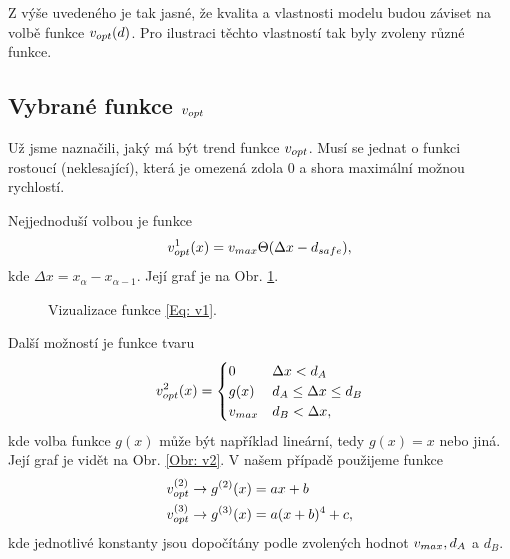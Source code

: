 \documentclass[a4paper, 12pt, fleqn]{article}
\begin{document}
Z výše uvedeného je tak jasné, že kvalita a vlastnosti modelu budou záviset na volbě funkce $v_{opt}(d)$. Pro ilustraci těchto vlastností tak byly zvoleny různé funkce.

\subsection{Vybrané funkce $v_{opt}$}
Už jsme naznačili, jaký má být trend funkce $v_{opt}$. Musí se jednat o funkci rostoucí (neklesající), která je omezená zdola 0 a shora maximální možnou rychlostí.

Nejjednoduší volbou je funkce
\begin{equation}
	v_{opt}^1(x) = v_{max} \Theta (\Delta x - d_{safe}),
	\label{Eq: v1}
\end{equation}
kde $\Delta x = x_{\alpha} - x_{\alpha - 1}$. Její graf je na Obr. \ref{Obr: v1}.

\begin{figure}
	\centering
	\caption{Vizualizace funkce \eqref{Eq: v1}.}
	\label{Obr: v1}
\end{figure}

Další možností je funkce tvaru
\begin{equation}
	v_{opt}^2(x)=\begin{cases}
	0 & \Delta x < d_A \\
	g(x) & d_A \leq \Delta x \leq d_B \\
	v_{max} & d_B < \Delta x,
	\end{cases}
	\label{Eq: v2}
\end{equation}
kde volba funkce $g(x)$ může být například lineární, tedy $g(x) = x$ nebo jiná. Její graf je vidět na Obr. \ref{Obr: v2}. V našem případě použijeme funkce
\begin{align*}
	v_{opt}^{(2)} & \rightarrow g^{(2)}(x) = ax + b \\
	v_{opt}^{(3)} & \rightarrow g^{(3)}(x) = a(x+b)^4 + c,
\end{align*}
kde jednotlivé konstanty jsou dopočítány podle zvolených hodnot $v_{max}, d_A$ a $d_B$.
\end{document}
